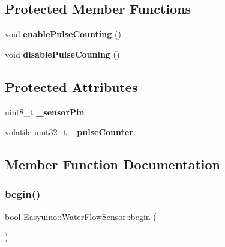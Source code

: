 \subsection*{Protected Member Functions}
\begin{DoxyCompactItemize}
\item 
\mbox{\label{class_easyuino_1_1_water_flow_sensor_adc2ba2c1888114b01719cfd6a659d59b}} 
void {\bfseries enable\+Pulse\+Counting} ()
\item 
\mbox{\label{class_easyuino_1_1_water_flow_sensor_a66d275227c18329b38f33834b4682ff3}} 
void {\bfseries disable\+Pulse\+Couning} ()
\end{DoxyCompactItemize}
\subsection*{Protected Attributes}
\begin{DoxyCompactItemize}
\item 
\mbox{\label{class_easyuino_1_1_water_flow_sensor_a7efef15ef9da3a66bd40183c4ea908ff}} 
uint8\+\_\+t {\bfseries \+\_\+sensor\+Pin}
\item 
\mbox{\label{class_easyuino_1_1_water_flow_sensor_a8877c5e4a3ed8012341d416ce05fa93e}} 
volatile uint32\+\_\+t {\bfseries \+\_\+pulse\+Counter}
\end{DoxyCompactItemize}


\subsection{Member Function Documentation}
\mbox{\label{class_easyuino_1_1_water_flow_sensor_a55dcab6c527b1e1951a1fff69efdb763}} 
\subsubsection{\texorpdfstring{begin()}{begin()}}
{\footnotesize\ttfamily bool Easyuino\+::\+Water\+Flow\+Sensor\+::begin (\begin{DoxyParamCaption}{ }\end{DoxyParamCaption})\hspace{0.3cm}{\ttfamily [virtual]}}



